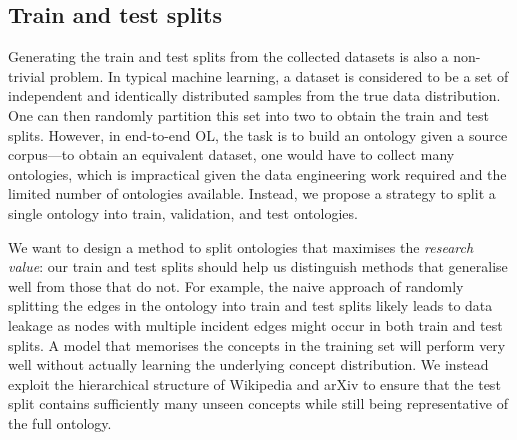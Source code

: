 \subsection{Train and test splits}  \label{sec:implementation:train-test-split}

Generating the train and test splits from the collected datasets is also a non-trivial problem. In typical machine learning, a dataset is considered to be a set of independent and identically distributed samples from the true data distribution. One can then randomly partition this set into two to obtain the train and test splits. However, in end-to-end OL, the task is to build an ontology given a source corpus---to obtain an equivalent dataset, one would have to collect many ontologies, which is impractical given the data engineering work required and the limited number of ontologies available. Instead, we propose a strategy to split a single ontology into train, validation, and test ontologies.



We want to design a method to split ontologies that maximises the \emph{research value}: our train and test splits should help us distinguish methods that generalise well from those that do not. For example, the naive approach of randomly splitting the edges in the ontology into train and test splits likely leads to data leakage as nodes with multiple incident edges might occur in both train and test splits. A model that memorises the concepts in the training set will perform very well without actually learning the underlying concept distribution. We instead exploit the hierarchical structure of Wikipedia and arXiv to ensure that the test split contains sufficiently many unseen concepts while still being representative of the full ontology.

